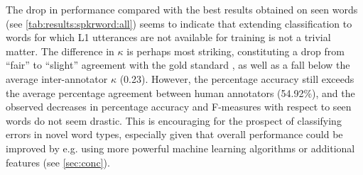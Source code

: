 \documentclass[a4paper]{article}
\newcommand{\TODO}[1]{{\color{red}\textbf{[TODO #1]}}}
\begin{document}
		The drop in performance compared with the best results obtained on seen words (see \cref{tab:results:spkrword:all}) seems to indicate that extending classification to words for which L1 utterances are not available for training is not a trivial matter. 
		The difference in $\kappa$ is perhaps most striking, constituting a drop from ``fair'' to ``slight'' agreement with the gold standard \cite{Landis1977}, as well as a fall below the average inter-annotator $\kappa$ (0.23). However, the percentage accuracy still exceeds the average percentage agreement between human annotators (54.92\%), and the observed decreases in percentage accuracy and F-measures with respect to seen words do not seem drastic. This is encouraging for the prospect of classifying errors in novel word types, especially given that overall performance could be improved by e.g. using more powerful machine learning algorithms or additional features (see \cref{sec:conc}).
		
	


		
\end{document}
